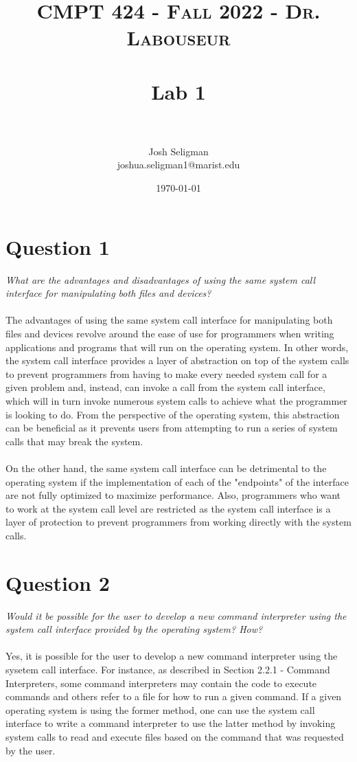 \documentclass[letterpaper, 10pt,DIV=13]{scrartcl}
\title{	
   \normalfont \normalsize 
   \textsc{CMPT 424 - Fall 2022 - Dr. Labouseur} \\[10pt] %
   \horrule{0.5pt} \\[0.25cm] 	%
   \huge Lab 1  \\     	    %
   \horrule{0.5pt} \\[0.25cm] 	%
}
\author{Josh Seligman \\ \normalsize joshua.seligman1@marist.edu}
\date{\normalsize\today} 	%
\numberwithin{equation}{section} %
\numberwithin{figure}{section} %
\numberwithin{table}{section} %
\begin{document}
\maketitle %

\section{Question 1}
\textit{What are the advantages and disadvantages of using the same system call interface for manipulating both files and devices?} \\ \\
The advantages of using the same system call interface for manipulating both files and devices revolve around the
ease of use for programmers when writing applications and programs that will run on the operating system.
In other words, the system call interface provides a layer of abstraction on top of the system calls to prevent
programmers from having to make every needed system call for a given problem and, instead, can invoke a call from
the system call interface, which will in turn invoke numerous system calls to achieve what the programmer is looking to do.
From the perspective of the operating system, this abstraction can be beneficial as it prevents users from attempting to
run a series of system calls that may break the system. \\ \\
On the other hand, the same system call interface can be detrimental to the operating system if the implementation
of each of the "endpoints" of the interface are not fully optimized to maximize performance. Also, programmers who
want to work at the system call level are restricted as the system call interface is a layer of protection to prevent
programmers from working directly with the system calls.

\section{Question 2}
\textit{Would it be possible for the user to develop a new command interpreter using the system call interface provided by the operating system? How?} \\ \\
Yes, it is possible for the user to develop a new command interpreter using the sysetem call interface. For instance, as described
in Section 2.2.1 - Command Interpreters, some command interpreters may contain the code to execute commands and others
refer to a file for how to run a given command. If a given operating system is using the former method, one can use the
system call interface to write a command interpreter to use the latter method by invoking system calls to read and execute
files based on the command that was requested by the user.
\end{document}
